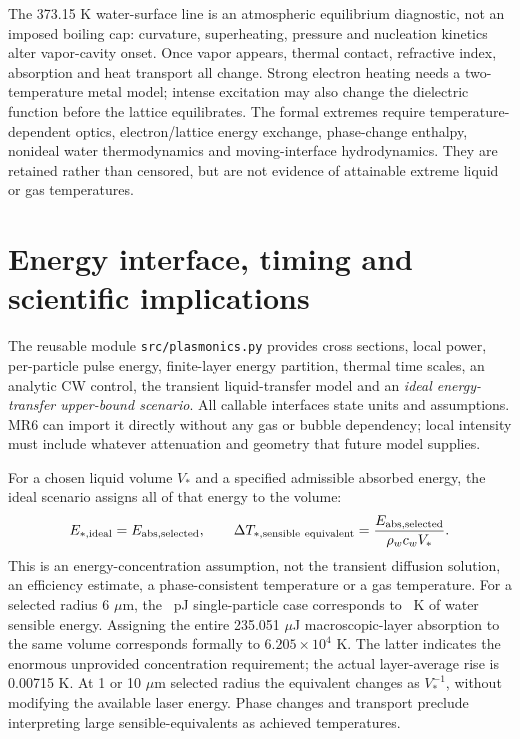 \documentclass[10pt,a4paper]{article}
\begin{document}
The 373.15 K water-surface line is an atmospheric equilibrium diagnostic, not an imposed boiling cap: curvature, superheating, pressure and nucleation kinetics alter vapor-cavity onset. Once vapor appears, thermal contact, refractive index, absorption and heat transport all change. Strong electron heating needs a two-temperature metal model; intense excitation may also change the dielectric function before the lattice equilibrates. The formal extremes require temperature-dependent optics, electron/lattice energy exchange, phase-change enthalpy, nonideal water thermodynamics and moving-interface hydrodynamics. They are retained rather than censored, but are not evidence of attainable extreme liquid or gas temperatures.
\newpage

\section{Energy interface, timing and scientific implications}
The reusable module \texttt{src/plasmonics.py} provides cross sections, local power, per-particle pulse energy, finite-layer energy partition, thermal time scales, an analytic CW control, the transient liquid-transfer model and an \emph{ideal energy-transfer upper-bound scenario}. All callable interfaces state units and assumptions. MR6 can import it directly without any gas or bubble dependency; local intensity must include whatever attenuation and geometry that future model supplies.

For a chosen liquid volume $V_*$ and a specified admissible absorbed energy, the ideal scenario assigns all of that energy to the volume:
\begin{equation}
 E_{*,\rm ideal}=E_{\mathrm{abs},\rm selected},\qquad
 \Delta T_{*,\rm sensible\ equivalent}=\frac{E_{\mathrm{abs},\rm selected}}{\rho_wc_wV_*}.\label{eq:upper}
\end{equation}
This is an energy-concentration assumption, not the transient diffusion solution, an efficiency estimate, a phase-consistent temperature or a gas temperature. For a selected radius 6 $\mu$m, the \SinglePJ\ pJ single-particle case corresponds to \SingleUpperK\ K of water sensible energy. Assigning the entire 235.051 $\mu$J macroscopic-layer absorption to the same volume corresponds formally to $6.205\times10^4$ K. The latter indicates the enormous unprovided concentration requirement; the actual layer-average rise is 0.00715 K. At 1 or 10 $\mu$m selected radius the equivalent changes as $V_*^{-1}$, without modifying the available laser energy. Phase changes and transport preclude interpreting large sensible-equivalents as achieved temperatures.
\end{document}
